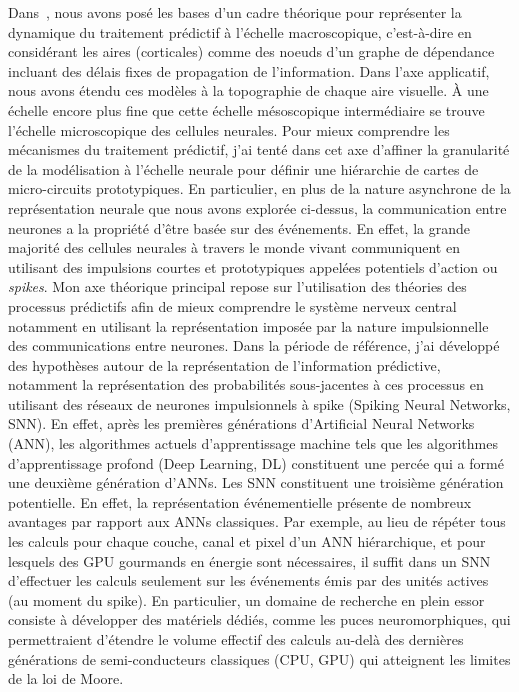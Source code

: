 \documentclass[10pt,french,a4paper]{article}%
\begin{document}
Dans~\citep{PerrinetAdamsFriston14}, nous avons posé les bases d'un cadre théorique pour représenter la dynamique du traitement prédictif à l'échelle macroscopique, c'est-à-dire en considérant les aires (corticales) comme des noeuds d'un graphe de dépendance incluant des délais fixes de propagation de l'information. Dans l'axe applicatif, nous avons étendu ces modèles à la topographie de chaque aire visuelle. À une échelle encore plus fine que cette échelle mésoscopique intermédiaire se trouve l'échelle microscopique des cellules neurales. Pour mieux comprendre les mécanismes du traitement prédictif, j'ai tenté dans cet axe d'affiner la granularité de la modélisation à l'échelle neurale pour définir une hiérarchie de cartes de micro-circuits prototypiques. En particulier, en plus de la nature asynchrone de la représentation neurale que nous avons explorée ci-dessus, la communication entre neurones a la propriété d'être basée sur des événements. En effet, la grande majorité des cellules neurales à travers le monde vivant communiquent en utilisant des impulsions courtes et prototypiques appelées potentiels d'action ou \emph{spikes}. 
Mon axe théorique principal repose sur l'utilisation des théories des processus prédictifs afin de mieux comprendre le système nerveux central notamment en utilisant la représentation imposée par la nature impulsionnelle des communications entre neurones. Dans la période de référence, j'ai développé des hypothèses autour de la représentation de l'information prédictive, notamment la représentation des probabilités sous-jacentes à ces processus en utilisant des réseaux de neurones impulsionnels à spike (Spiking Neural Networks, SNN).
En effet, après les premières générations d'Artificial Neural Networks (ANN), les algorithmes actuels d'apprentissage machine tels que les algorithmes d'apprentissage profond (Deep Learning, DL) constituent une percée qui a formé une deuxième génération d'ANNs. Les SNN constituent une troisième génération potentielle. En effet, la représentation événementielle présente de nombreux avantages par rapport aux ANNs classiques. Par exemple, au lieu de répéter tous les calculs ­pour chaque couche, canal et pixel d'un ANN hiérarchique, et pour lesquels des GPU gourmands en énergie sont nécessaires, il suffit dans un SNN d'effectuer les calculs seulement sur les événements émis par des unités actives (au moment du spike). En particulier, un domaine de recherche en plein essor consiste à développer des matériels dédiés, comme les puces neuromorphiques, qui permettraient d'étendre le volume effectif des calculs au-delà des dernières générations de semi-conducteurs classiques (CPU, GPU) qui atteignent les limites de la loi de Moore.
\end{document}
